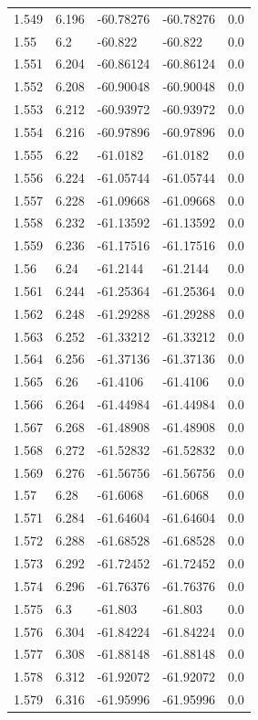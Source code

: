 \begin{tabular}{lllll}
1.549 & 6.196 & -60.78276 & -60.78276 & 0.0 \\
1.55 & 6.2 & -60.822 & -60.822 & 0.0 \\
1.551 & 6.204 & -60.86124 & -60.86124 & 0.0 \\
1.552 & 6.208 & -60.90048 & -60.90048 & 0.0 \\
1.553 & 6.212 & -60.93972 & -60.93972 & 0.0 \\
1.554 & 6.216 & -60.97896 & -60.97896 & 0.0 \\
1.555 & 6.22 & -61.0182 & -61.0182 & 0.0 \\
1.556 & 6.224 & -61.05744 & -61.05744 & 0.0 \\
1.557 & 6.228 & -61.09668 & -61.09668 & 0.0 \\
1.558 & 6.232 & -61.13592 & -61.13592 & 0.0 \\
1.559 & 6.236 & -61.17516 & -61.17516 & 0.0 \\
1.56 & 6.24 & -61.2144 & -61.2144 & 0.0 \\
1.561 & 6.244 & -61.25364 & -61.25364 & 0.0 \\
1.562 & 6.248 & -61.29288 & -61.29288 & 0.0 \\
1.563 & 6.252 & -61.33212 & -61.33212 & 0.0 \\
1.564 & 6.256 & -61.37136 & -61.37136 & 0.0 \\
1.565 & 6.26 & -61.4106 & -61.4106 & 0.0 \\
1.566 & 6.264 & -61.44984 & -61.44984 & 0.0 \\
1.567 & 6.268 & -61.48908 & -61.48908 & 0.0 \\
1.568 & 6.272 & -61.52832 & -61.52832 & 0.0 \\
1.569 & 6.276 & -61.56756 & -61.56756 & 0.0 \\
1.57 & 6.28 & -61.6068 & -61.6068 & 0.0 \\
1.571 & 6.284 & -61.64604 & -61.64604 & 0.0 \\
1.572 & 6.288 & -61.68528 & -61.68528 & 0.0 \\
1.573 & 6.292 & -61.72452 & -61.72452 & 0.0 \\
1.574 & 6.296 & -61.76376 & -61.76376 & 0.0 \\
1.575 & 6.3 & -61.803 & -61.803 & 0.0 \\
1.576 & 6.304 & -61.84224 & -61.84224 & 0.0 \\
1.577 & 6.308 & -61.88148 & -61.88148 & 0.0 \\
1.578 & 6.312 & -61.92072 & -61.92072 & 0.0 \\
1.579 & 6.316 & -61.95996 & -61.95996 & 0.0 \\

\end{tabular}
